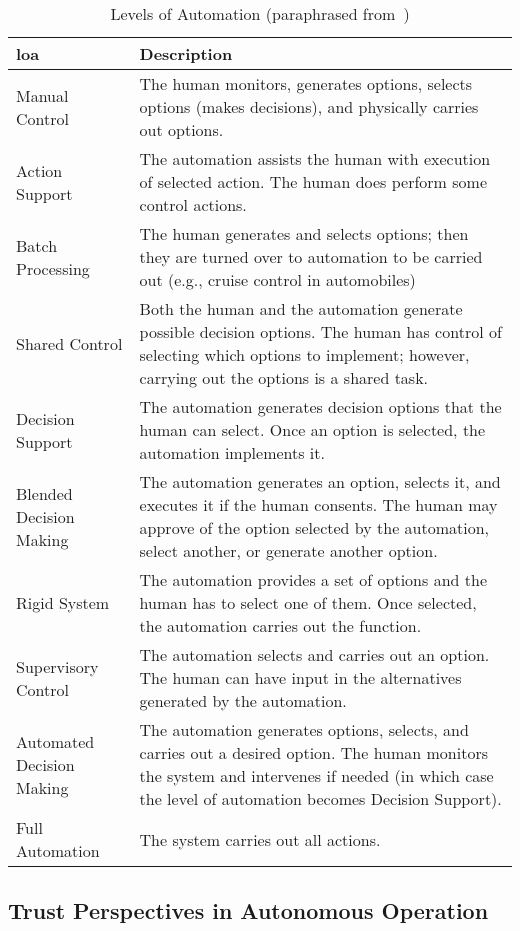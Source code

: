 \begin{table}\centering
  \caption[Levels of Automation]{Levels of Automation (paraphrased from~\citet{Endsley1999})}
  \label{tab:autonomy_levels_endsley}
  \begin{tabularx}{\textwidth}{p{3cm} X}\toprule
    \gls{loa} & Description \\ \midrule
    Manual Control &
    The human monitors, generates options, selects options (makes decisions), and physically carries out options.\\
    Action Support &
    The automation assists the human with execution of selected action. The human does perform some control actions.\\
    Batch Processing &
    The human generates and selects options; then they are turned over to automation to be carried out (e.g., cruise control in automobiles)\\
    Shared Control &
    Both the human and the automation generate possible decision options. The human has control of selecting which options to implement; however, carrying out the options is a shared task.\\
    Decision Support &
    The automation generates decision options that the human can select. Once an option is selected, the automation implements it.\\
    Blended Decision Making & 
    The automation generates an option, selects it, and executes it if the human consents. The human may approve of the option selected by the automation, select another, or generate another option.\\
    Rigid System &      
    The automation provides a set of options and the human has to select one of them. Once selected, the automation carries out the function.\\
    Supervisory Control &
    The automation selects and carries out an option. The human can have input in the alternatives generated by the automation.\\
    Automated Decision Making & 
    The automation generates options, selects, and carries out a desired option. The human monitors the system and intervenes if needed (in which case the level of automation becomes Decision Support).\\
    Full Automation &   The system carries out all actions.\\ \bottomrule
  \end{tabularx}
\end{table}


\subsection{Trust Perspectives in Autonomous Operation}\label{sec:trust_perspectives}

